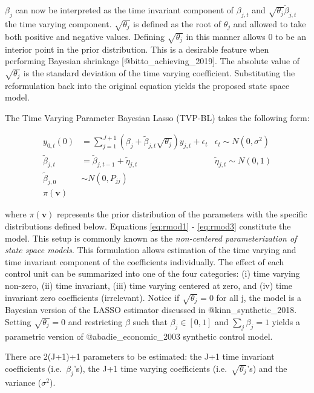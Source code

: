 \documentclass[
]{article}
\begin{document}
\(\beta_j\) can now be interpreted as the time invariant component of
\(\beta_{j,t}\) and \(\sqrt{\theta_j}\tilde{\beta}_{j,t}\) the time
varying component. \(\sqrt{\theta_j}\) is defined as the root of
\(\theta_j\) and allowed to take both positive and negative values.
Defining \(\sqrt{\theta_j}\) in this manner allows 0 to be an interior
point in the prior distribution. This is a desirable feature when
performing Bayesian shrinkage {[}@bitto\_achieving\_2019{]}. The
absolute value of \(\sqrt{\theta_j}\) is the standard deviation of the
time varying coefficient. Substituting the reformulation back into the
original equation yields the proposed state space model.

\begin{assumption}[Model]
The Time Varying Parameter Bayesian Lasso (TVP-BL) takes the following form:
\end{assumption}

\begin{align}
y_{0,t}(0)&=\sum_{j=1}^{J+1} \left(\beta_{j}+\tilde{\beta}_{j,t}\sqrt{\theta_j}\right)y_{j,t}+\epsilon_t & \epsilon_t \sim N(0, \sigma^2) \label{eq:rmod1}\\
\tilde{\beta}_{j,t}&= \tilde{\beta}_{j,t-1}+\tilde{\eta}_{j,t} & \tilde{\eta}_{j,t} \sim N(0,1) \label{eq:rmod2}\\
\tilde{\beta}_{j,0}& \sim N(0,P_{jj}) \\
\pi(\mathbf{v}) \label{eq:rmod3}
\end{align}

where \(\pi(\mathbf{v})\) represents the prior distribution of the
parameters with the specific distributions defined below. Equations
\eqref{eq:rmod1} - \eqref{eq:rmod3} constitute the model. This setup is
commonly known as the \emph{non-centered parameterization of state space
models}. This formulation allows estimation of the time varying and time
invariant component of the coefficients individually. The effect of each
control unit can be summarized into one of the four categories: (i) time
varying non-zero, (ii) time invariant, (iii) time varying centered at
zero, and (iv) time invariant zero coefficients (irrelevant). Notice if
\(\sqrt{\theta_j}=0\) for all j, the model is a Bayesian version of the
LASSO estimator discussed in @kinn\_synthetic\_2018. Setting
\(\sqrt{\theta_j}=0\) and restricting \(\beta\) such that
\(\beta_j \in [0,1]\) and \(\sum_j \beta_j =1\) yields a parametric
version of @abadie\_economic\_2003 synthetic control model.

There are 2(J+1)+1 parameters to be estimated: the J+1 time invariant
coefficients (i.e.~\(\beta_j\)'s), the J+1 time varying coefficients
(i.e.~\(\sqrt{\theta_j}\)'s) and the variance (\(\sigma^2\)).
\end{document}

